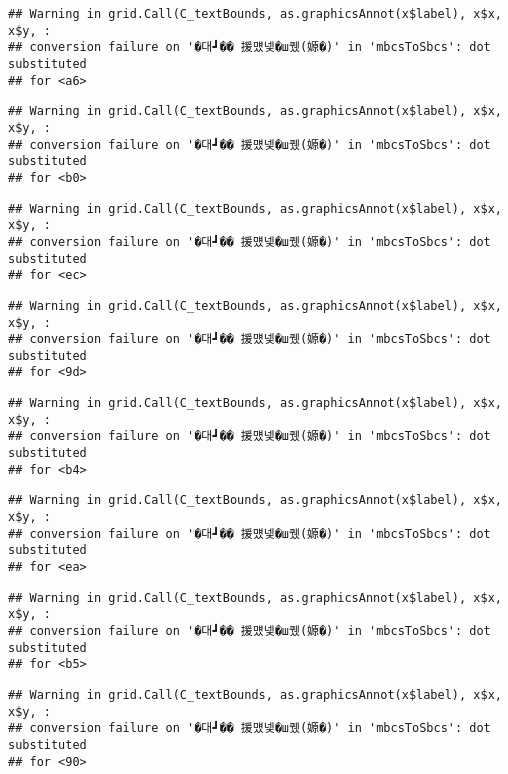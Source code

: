 \documentclass[
]{article}
\begin{document}
\begin{verbatim}
## Warning in grid.Call(C_textBounds, as.graphicsAnnot(x$label), x$x, x$y, :
## conversion failure on '�대┛�� 援먰넻�ш퀬(嫄�)' in 'mbcsToSbcs': dot substituted
## for <a6>
\end{verbatim}

\begin{verbatim}
## Warning in grid.Call(C_textBounds, as.graphicsAnnot(x$label), x$x, x$y, :
## conversion failure on '�대┛�� 援먰넻�ш퀬(嫄�)' in 'mbcsToSbcs': dot substituted
## for <b0>
\end{verbatim}

\begin{verbatim}
## Warning in grid.Call(C_textBounds, as.graphicsAnnot(x$label), x$x, x$y, :
## conversion failure on '�대┛�� 援먰넻�ш퀬(嫄�)' in 'mbcsToSbcs': dot substituted
## for <ec>
\end{verbatim}

\begin{verbatim}
## Warning in grid.Call(C_textBounds, as.graphicsAnnot(x$label), x$x, x$y, :
## conversion failure on '�대┛�� 援먰넻�ш퀬(嫄�)' in 'mbcsToSbcs': dot substituted
## for <9d>
\end{verbatim}

\begin{verbatim}
## Warning in grid.Call(C_textBounds, as.graphicsAnnot(x$label), x$x, x$y, :
## conversion failure on '�대┛�� 援먰넻�ш퀬(嫄�)' in 'mbcsToSbcs': dot substituted
## for <b4>
\end{verbatim}

\begin{verbatim}
## Warning in grid.Call(C_textBounds, as.graphicsAnnot(x$label), x$x, x$y, :
## conversion failure on '�대┛�� 援먰넻�ш퀬(嫄�)' in 'mbcsToSbcs': dot substituted
## for <ea>
\end{verbatim}

\begin{verbatim}
## Warning in grid.Call(C_textBounds, as.graphicsAnnot(x$label), x$x, x$y, :
## conversion failure on '�대┛�� 援먰넻�ш퀬(嫄�)' in 'mbcsToSbcs': dot substituted
## for <b5>
\end{verbatim}

\begin{verbatim}
## Warning in grid.Call(C_textBounds, as.graphicsAnnot(x$label), x$x, x$y, :
## conversion failure on '�대┛�� 援먰넻�ш퀬(嫄�)' in 'mbcsToSbcs': dot substituted
## for <90>
\end{verbatim}
\end{document}
